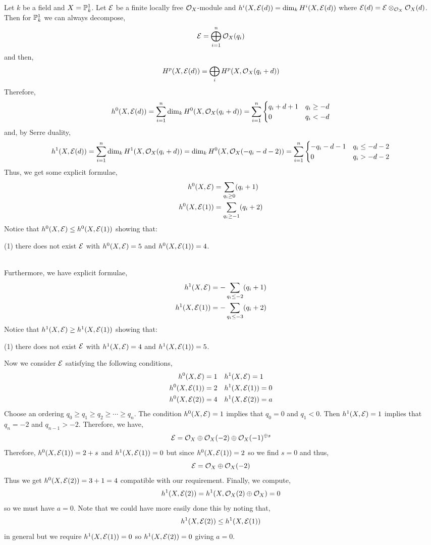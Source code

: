 \documentclass[12pt]{article}
\begin{document}
Let $k$ be a field and $X = \P^1_k$. Let $\E$ be a finite locally free $\struct{X}$-module and $h^i(X, \E(d)) = \dim_k H^i(X, \E(d))$ where $\E(d) = \E \otimes_{\struct{X}} \struct{X}(d)$. Then for $\P^1_k$ we can always decompose,
\[ \E = \bigoplus_{i = 1}^n \struct{X}(q_i) \]
and then,
\[ H^p(X, \E(d)) = \bigoplus_i H^p(X, \struct{X}(q_i + d)) \]
Therefore,
\[ h^0(X, \E(d)) = \sum_{i = 1}^n \dim_k H^0(X, \struct{X}(q_i + d)) = \sum_{i = 1}^n
\begin{cases}
q_i + d + 1 & q_i \ge - d
\\
0 & q_i < -d
\end{cases} \]
and, by Serre duality,
\[ h^1(X, \E(d)) = \sum_{i = 1}^n \dim_k H^1(X, \struct{X}(q_i + d)) = \dim_k H^0(X, \struct{X}(- q_i - d - 2)) = \sum_{i = 1}^n
\begin{cases}
-q_i - d - 1 & q_i \le -d - 2
\\
0 & q_i > -d - 2
\end{cases} \]
Thus, we get some explicit formulae,
\begin{align*}
h^0(X, \E) & = \sum_{q_i \ge 0} (q_i + 1) 
\\
h^0(X, \E(1)) & = \sum_{q_i \ge -1} (q_i + 2)
\end{align*}
Notice that $h^0(X, \E) \le h^0(X, \E(1))$ showing that:
\begin{center}
(1) there does not exist $\E$ with $h^0(X, \E) = 5$ and $h^0(X, \E(1)) = 4$.
\end{center}
\noindent\\
Furthermore, we have explicit formulae,
\begin{align*}
h^1(X, \E) & = - \sum_{q_i \le -2} (q_i + 1) 
\\
h^1(X, \E(1)) & =  - \sum_{q_i \le -3} (q_i + 2)
\end{align*}
Notice that $h^1(X, \E) \ge h^1(X, \E(1))$ showing that:
\begin{center}
(1) there does not exist $\E$ with $h^1(X, \E) = 4$ and $h^1(X, \E(1)) = 5$.
\end{center}
Now we consider $\E$ satisfying the following conditions,
\begin{align*}
h^0(X, \E) & = 1 \quad h^1(X, \E) = 1
\\
h^0(X, \E(1)) & = 2 \quad h^1(X, \E(1)) = 0
\\
h^0(X, \E(2)) & = 4 \quad h^1(X, \E(2)) = a
\end{align*}
Choose an ordering $q_0 \ge q_1 \ge q_2 \ge \cdots \ge q_n$. The condition $h^0(X, \E) = 1$ implies that $q_0 = 0$ and $q_1 < 0$. Then $h^1(X, \E) = 1$ implies that $q_n = -2$ and $q_{n-1} > -2$. Therefore, we have,
\[ \E = \struct{X} \oplus \struct{X}(-2) \oplus \struct{X}(-1)^{\oplus s} \]
Therefore, $h^0(X, \E(1)) = 2 + s$ and $h^1(X, \E(1)) = 0$ but since $h^0(X, \E(1)) = 2$ so we find $s = 0$ and thus,
\[ \E = \struct{X} \oplus \struct{X}(-2) \]
Thus we get $h^0(X, \E(2)) = 3 + 1 = 4$ compatible with our requirement. Finally, we compute,
\[ h^1(X, \E(2)) = h^1(X, \struct{X}(2) \oplus \struct{X}) = 0 \]
so we must have $a = 0$. Note that we could have more easily done this by noting that,
\[ h^1(X, \E(2)) \le h^1(X, \E(1)) \]
in general but we require $h^1(X, \E(1)) = 0$ so $h^1(X, \E(2)) = 0$ giving $a = 0$. 
\end{document}
